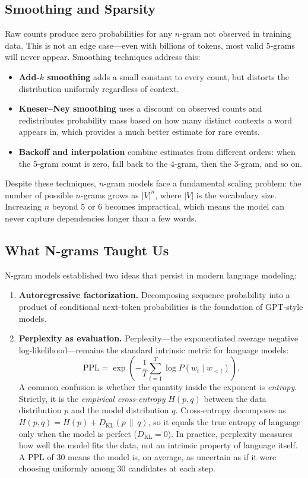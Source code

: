 \subsection{Smoothing and Sparsity}

Raw counts produce zero probabilities for any $n$-gram not observed in training data. This is not an edge case---even with billions of tokens, most valid 5-grams will never appear. Smoothing techniques address this:

\begin{itemize}
    \item \textbf{Add-$k$ smoothing} adds a small constant to every count, but distorts the distribution uniformly regardless of context.
    \item \textbf{Kneser--Ney smoothing} uses a discount on observed counts and redistributes probability mass based on how many distinct contexts a word appears in, which provides a much better estimate for rare events.
    \item \textbf{Backoff and interpolation} combine estimates from different orders: when the 5-gram count is zero, fall back to the 4-gram, then the 3-gram, and so on.
\end{itemize}

Despite these techniques, $n$-gram models face a fundamental scaling problem: the number of possible $n$-grams grows as $|V|^n$, where $|V|$ is the vocabulary size. Increasing $n$ beyond 5 or 6 becomes impractical, which means the model can never capture dependencies longer than a few words.

\subsection{What N-grams Taught Us}

N-gram models established two ideas that persist in modern language modeling:

\begin{enumerate}
    \item \textbf{Autoregressive factorization.} Decomposing sequence probability into a product of conditional next-token probabilities is the foundation of GPT-style models.
    \item \textbf{Perplexity as evaluation.} Perplexity---the exponentiated average negative log-likelihood---remains the standard intrinsic metric for language models:
    \[
    \text{PPL} = \exp\!\left(-\frac{1}{T}\sum_{t=1}^T \log P(w_t \mid w_{<t})\right).
    \]
    A common confusion is whether the quantity inside the exponent is \emph{entropy}. Strictly, it is the \emph{empirical cross-entropy} $H(p, q)$ between the data distribution $p$ and the model distribution $q$. Cross-entropy decomposes as $H(p, q) = H(p) + D_{\text{KL}}(p \,\|\, q)$, so it equals the true entropy of language only when the model is perfect ($D_{\text{KL}} = 0$). In practice, perplexity measures how well the model fits the data, not an intrinsic property of language itself. A PPL of 30 means the model is, on average, as uncertain as if it were choosing uniformly among 30 candidates at each step.
\end{enumerate}

